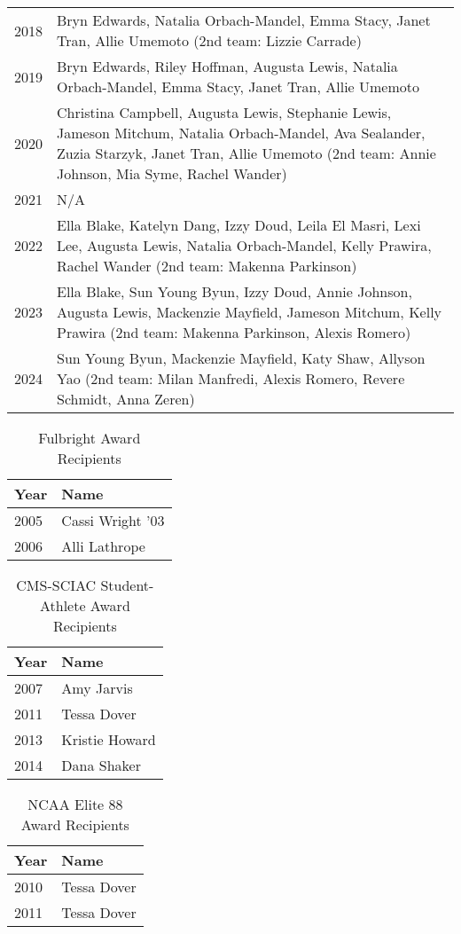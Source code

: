 \begin{longtable}{l l}
    2018 & Bryn Edwards, Natalia Orbach-Mandel, Emma Stacy, Janet Tran, Allie Umemoto (2nd team: Lizzie Carrade) \\
    2019 & Bryn Edwards, Riley Hoffman, Augusta Lewis, Natalia Orbach-Mandel, Emma Stacy, Janet Tran, Allie Umemoto \\
    2020 & Christina Campbell, Augusta Lewis, Stephanie Lewis, Jameson Mitchum, Natalia Orbach-Mandel, Ava Sealander, Zuzia Starzyk, Janet Tran, Allie Umemoto (2nd team: Annie Johnson, Mia Syme, Rachel Wander) \\
    2021 & N/A \\
    2022 & Ella Blake, Katelyn Dang, Izzy Doud, Leila El Masri, Lexi Lee, Augusta Lewis, Natalia Orbach-Mandel, Kelly Prawira, Rachel Wander (2nd team: Makenna Parkinson) \\
    2023 & Ella Blake, Sun Young Byun, Izzy Doud, Annie Johnson, Augusta Lewis, Mackenzie Mayfield, Jameson Mitchum, Kelly Prawira (2nd team: Makenna Parkinson, Alexis Romero) \\
    2024 & Sun Young Byun, Mackenzie Mayfield, Katy Shaw, Allyson Yao (2nd team: Milan Manfredi, Alexis Romero, Revere Schmidt, Anna Zeren) \\
    
    \end{longtable}
    
\begin{table}[htbp]
    \centering
    \caption*{Fulbright Award Recipients}
    \begin{tabular}{ll}
    \toprule
    Year & Name \\
    \midrule
    2005 & Cassi Wright '03 \\
    2006 & Alli Lathrope \\
    \bottomrule
    \end{tabular}
    \end{table}
    
    \begin{table}[htbp]
    \centering
    \caption*{CMS-SCIAC Student-Athlete Award Recipients}
    \begin{tabular}{ll}
    \toprule
    Year & Name \\
    \midrule
    2007 & Amy Jarvis \\
    2011 & Tessa Dover \\
    2013 & Kristie Howard \\
    2014 & Dana Shaker \\
    \bottomrule
    \end{tabular}
    \end{table}
    
    \begin{table}[htbp]
    \centering
    \caption*{NCAA Elite 88 Award Recipients}
    \begin{tabular}{ll}
    \toprule
    Year & Name \\
    \midrule
    2010 & Tessa Dover \\
    2011 & Tessa Dover \\
    \bottomrule
    \end{tabular}
    \end{table}
    